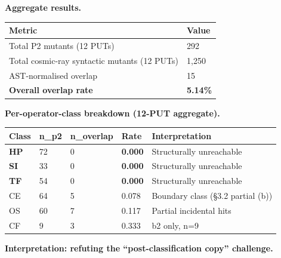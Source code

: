 \documentclass[review,12pt,authoryear]{elsarticle}
\newcounter{none}                   %
\begin{document}
\textbf{Aggregate results.}

{\def\LTcaptype{none} %
\begin{longtable}[]{@{}ll@{}}
\toprule\noalign{}
Metric & Value \\
\midrule\noalign{}
\endhead
\bottomrule\noalign{}
\endlastfoot
Total P2 mutants (12 PUTs) & 292 \\
Total cosmic-ray syntactic mutants (12 PUTs) & 1,250 \\
AST-normalised overlap & 15 \\
\textbf{Overall overlap rate} & \textbf{5.14\%} \\
\end{longtable}
}

\textbf{Per-operator-class breakdown (12-PUT aggregate).}

{\def\LTcaptype{none} %
\begin{longtable}[]{@{}lllll@{}}
\toprule\noalign{}
Class & n\_p2 & n\_overlap & Rate & Interpretation \\
\midrule\noalign{}
\endhead
\bottomrule\noalign{}
\endlastfoot
\textbf{HP} & 72 & 0 & \textbf{0.000} & Structurally unreachable \\
\textbf{SI} & 33 & 0 & \textbf{0.000} & Structurally unreachable \\
\textbf{TF} & 54 & 0 & \textbf{0.000} & Structurally unreachable \\
CE & 64 & 5 & 0.078 & Boundary class (§3.2 partial (b)) \\
OS & 60 & 7 & 0.117 & Partial incidental hits \\
CF & 9 & 3 & 0.333 & b2 only, n=9 \\
\end{longtable}
}

\textbf{Interpretation: refuting the ``post-classification copy''
challenge.}
\end{document}
